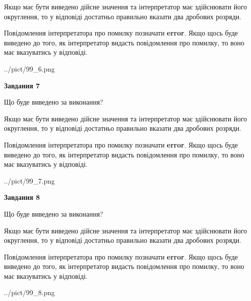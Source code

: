 \documentclass[12pt, ukrainian]{article}
\begin{document}
{\begin {Large}
Якщо має бути виведено дійсне значення та інтерпретатор має здійснювати його округлення, 
то у відповіді достатньо правильно вказати два дробових розряди.

Повідомлення інтерпретатора про помилку позначати \textbf{error}.
Якщо щось буде виведено до того, як інтерпретатор видасть повідомлення про помилку, 
то воно має вказуватись у відповіді. \par

\begin{center}
	{../pict/99_6.png}
\end{center}
\newpage

{\begin {center}\textbf{Завдання 7}\end {center}}\par
Що буде виведено за виконання? \par

Якщо має бути виведено дійсне значення та інтерпретатор має здійснювати його округлення, 
то у відповіді достатньо правильно вказати два дробових розряди.

Повідомлення інтерпретатора про помилку позначати \textbf{error}.
Якщо щось буде виведено до того, як інтерпретатор видасть повідомлення про помилку, 
то воно має вказуватись у відповіді. \par

\begin{center}
	{../pict/99_7.png}
\end{center}
\newpage

{\begin {center}\textbf{Завдання 8}\end {center}}\par
Що буде виведено за виконання? \par

Якщо має бути виведено дійсне значення та інтерпретатор має здійснювати його округлення, 
то у відповіді достатньо правильно вказати два дробових розряди.

Повідомлення інтерпретатора про помилку позначати \textbf{error}.
Якщо щось буде виведено до того, як інтерпретатор видасть повідомлення про помилку, 
то воно має вказуватись у відповіді. \par

\begin{center}
	{../pict/99_8.png}
\end{center}
\newpage


\end{Large}}
\end{document}
